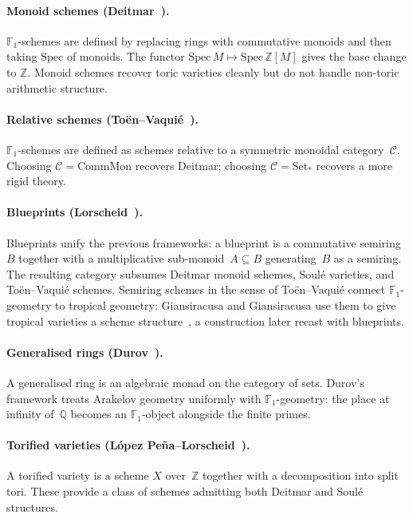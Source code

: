 \paragraph{Monoid schemes (Deitmar~\cite{deitmar05}).}
$\mathbb{F}_1$-schemes are defined by replacing rings with
commutative monoids and then taking $\mathrm{Spec}$ of monoids.
The functor $\mathrm{Spec}\,M\mapsto\mathrm{Spec}\,\mathbb{Z}[M]$
gives the base change to $\mathbb{Z}$.  Monoid schemes recover
toric varieties cleanly but do not handle non-toric arithmetic
structure.

\paragraph{Relative schemes
(To\"en--Vaqui\'e~\cite{toen09}).}
$\mathbb{F}_1$-schemes are defined as schemes relative to a
symmetric monoidal category~$\mathcal{C}$.  Choosing
$\mathcal{C}=\mathrm{CommMon}$ recovers Deitmar; choosing
$\mathcal{C}=\mathrm{Set}_*$ recovers a more rigid theory.

\paragraph{Blueprints (Lorscheid~\cite{lorscheid12blueprints}).}
Blueprints unify the previous frameworks: a blueprint is a
commutative semiring~$B$ together with a multiplicative
sub-monoid~$A\subseteq B$ generating~$B$ as a semiring.  The
resulting category subsumes Deitmar monoid schemes, Soul\'e
varieties, and To\"en--Vaqui\'e schemes.  Semiring schemes in the sense of To\"en--Vaqui\'e connect $\mathbb{F}_1$-geometry to tropical geometry: Giansiracusa and Giansiracusa use them to give tropical varieties a scheme structure~\cite{giansiracusa16}, a construction later recast with blueprints.

\paragraph{Generalised rings (Durov~\cite{durov07}).}
A generalised ring is an algebraic monad on the category of
sets.  Durov's framework treats Arakelov geometry uniformly with
$\mathbb{F}_1$-geometry: the place at infinity of~$\mathbb{Q}$
becomes an $\mathbb{F}_1$-object alongside the finite primes.

\paragraph{Torified varieties
(L\'opez Pe\~na--Lorscheid~\cite{lopezpena09torified}).}
A torified variety is a scheme $X$ over~$\mathbb{Z}$ together with
a decomposition into split tori.  These provide a class of
schemes admitting both Deitmar and Soul\'e structures.

